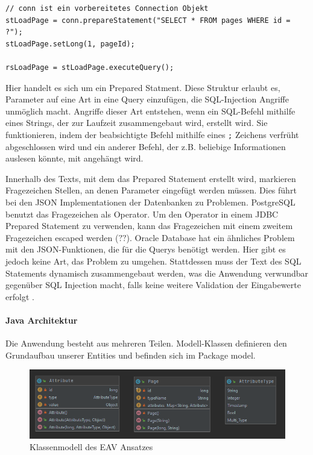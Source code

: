 \begin{lstlisting}[caption={Prepared Statement mit JDBC}]
// conn ist ein vorbereitetes Connection Objekt
stLoadPage = conn.prepareStatement("SELECT * FROM pages WHERE id = ?");
stLoadPage.setLong(1, pageId);
	
rsLoadPage = stLoadPage.executeQuery();
\end{lstlisting}

Hier handelt es sich um ein Prepared Statment. Diese Struktur erlaubt es, Parameter auf eine Art in eine Query einzufügen, die SQL-Injection Angriffe unmöglich macht. Angriffe dieser Art entstehen, wenn ein SQL-Befehl mithilfe eines Strings, der zur Laufzeit zusammengebaut wird, erstellt wird. Sie funktionieren, indem der beabsichtigte Befehl mithilfe eines \lstinline|;| Zeichens verfrüht abgeschlossen wird und ein anderer Befehl, der z.B. beliebige Informationen auslesen könnte, mit angehängt wird.

Innerhalb des Texts, mit dem das Prepared Statement erstellt wird, markieren Fragezeichen Stellen, an denen Parameter eingefügt werden müssen. Dies führt bei den JSON Implementationen der Datenbanken zu Problemen. PostgreSQL benutzt das Fragezeichen als Operator. Um den Operator in einem JDBC Prepared Statement zu verwenden, kann das Fragezeichen mit einem zweitem Fragezeichen escaped werden ($??$). Oracle Database hat ein ähnliches Problem mit den JSON-Funktionen, die für die Querys benötigt werden. Hier gibt es jedoch keine Art, das Problem zu umgehen. Stattdessen muss der Text des SQL Statements dynamisch zusammengebaut werden, was die Anwendung verwundbar gegenüber SQL Injection macht, falls keine weitere Validation der Eingabewerte erfolgt \cite{StackOverflow.14.07.2021}.

\paragraph{Java Architektur}
Die Anwendung besteht aus mehreren Teilen. Modell-Klassen definieren den Grundaufbau unserer Entities und befinden sich im Package model. 

\begin{figure}[h]
\centering
\includegraphics[width=\textwidth]{bilder/model.png}
\caption{Klassenmodell des EAV Ansatzes}
\end{figure}

